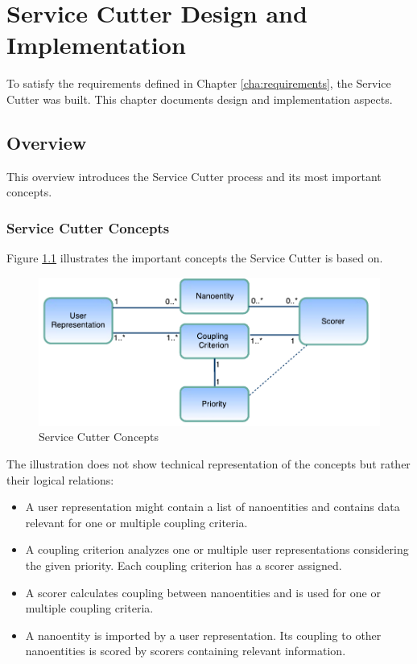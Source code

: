 
\chapter{Service Cutter Design and Implementation}
\label{cha:implementation}

To satisfy the requirements defined in Chapter \ref{cha:requirements}, the Service Cutter was built. This chapter documents design and implementation aspects.

\section{Overview}

This overview introduces the Service Cutter process and its most important concepts.

\subsection{Service Cutter Concepts}

Figure \ref{fig:concepts} illustrates the important concepts the Service Cutter is based on.

\begin{figure}[H]
	\begin{center}
		\includegraphics[scale=0.8]{diagrams/concepts.pdf}
		\caption{Service Cutter Concepts}
		\label{fig:concepts}
	\end{center}
\end{figure}

The illustration does not show technical representation of the concepts but rather their logical relations:

\begin{itemize}
	\item A user representation might contain a list of nanoentities and contains data relevant for one or multiple coupling criteria.
	\item A coupling criterion analyzes one or multiple user representations considering the given priority. Each coupling criterion has a scorer assigned. 
	\item A scorer calculates coupling between nanoentities and is used for one or multiple coupling criteria.
	\item A nanoentity is imported by a user representation. Its coupling to other nanoentities is scored by scorers containing relevant information.
\end{itemize}

